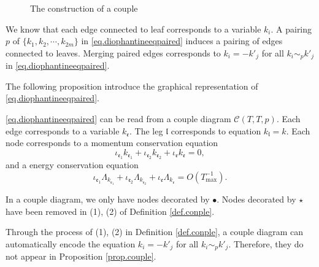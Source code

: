 \begin{defn}
\begin{enumerate}
\begin{figure}[H]
{
    }
        \caption{The construction of a couple}
        \label{fig.couple}
    \end{figure}
    
    We know that each edge connected to leaf corresponds to a variable $k_i$. A pairing $p$ of $\{k_1,k_2,\cdots,k_{2m}\}$ in \eqref{eq.diophantineeqpaired} induces a pairing of edges connected to leaves. Merging paired edges corresponds to $k_{i}=-k'_{j}$ for all $k_{i}\sim_{p}k'_{j}$ in \eqref{eq.diophantineeqpaired}. 
\end{enumerate}
\end{defn}

The following proposition introduce the graphical representation of \eqref{eq.diophantineeqpaired}.

\begin{prop}\label{prop.couple}
\eqref{eq.diophantineeqpaired} can be read from a couple diagram $\mathcal{C}(T,T,p)$. Each edge corresponds to a variable $k_{\mathfrak{e}}$. The leg $\mathfrak{l}$ corresponds to equation $k_{\mathfrak{l}}=k$. Each node corresponds to a momentum conservation equation
\begin{equation}
    \iota_{\mathfrak{e}_1}k_{\mathfrak{e}_1}+\iota_{\mathfrak{e}_2}k_{\mathfrak{e}_2}+\iota_{\mathfrak{e}}k_{\mathfrak{e}}=0,
\end{equation} 
and a energy conservation equation \begin{equation}
    \iota_{\mathfrak{e}_1}\Lambda_{k_{\mathfrak{e}_1}}+\iota_{\mathfrak{e}_2}\Lambda_{k_{\mathfrak{e}_2}}+\iota_{\mathfrak{e}}\Lambda_{k_{\mathfrak{e}}} = O(T^{-1}_{\text{max}}).
\end{equation}  
\end{prop}
\begin{rem}
In a couple diagram, we only have nodes decorated by $\bullet$. Nodes decorated by $\star$ have been removed in (1), (2) of Definition \ref{def.conple}.
\end{rem}
\begin{rem}
Through the process of (1), (2) in Definition \ref{def.conple}, a couple diagram can automatically encode the equation $k_{i}=-k'_{j}$ for all $k_{i}\sim_{p}k'_{j}$. Therefore, they do not appear in Proposition \ref{prop.couple}.
\end{rem}


